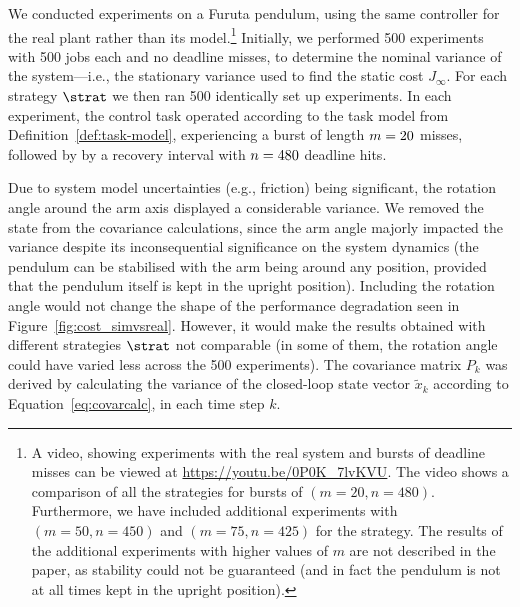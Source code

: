 We conducted experiments on a Furuta pendulum, using the same controller for the real plant rather than its model.\footnote{A video, showing experiments with the real system and bursts of deadline misses can be viewed at \url{https://youtu.be/0P0K_7lvKVU}. The video shows a comparison of all the strategies for bursts of $(m = 20, n=480)$. Furthermore, we have included additional experiments with $(m=50, n=450)$ and $(m=75, n=425)$ for the \tSH{} strategy. The results of the additional experiments with higher values of $m$ are not described in the paper, as stability could not be guaranteed (and in fact the pendulum is not at all times kept in the upright position).}
Initially, we performed 500 experiments with 500 jobs each and no deadline misses, to determine the nominal variance of the system---i.e., the stationary variance used to find the static cost $J_\infty$.
For each strategy $\strat$ we then ran 500 identically set up experiments. 
In each experiment, the control task operated according to the task model from Definition~\ref{def:task-model}, experiencing a burst of length $m=20$ misses, followed by by a recovery interval with $n=480$ deadline hits.

Due to system model uncertainties (e.g., friction) being significant, the rotation angle around the arm axis displayed a considerable variance.
We removed the state from the covariance calculations, since the arm angle majorly impacted the variance despite its inconsequential significance on the system dynamics (the pendulum can be stabilised with the arm being around any position, provided that the pendulum itself is kept in the upright position).
Including the rotation angle would not change the shape of the performance degradation seen in Figure~\ref{fig:cost_simvsreal}. 
However, it would make the results obtained with different strategies $\strat$ not comparable (in some of them, the rotation angle could have varied less across the 500 experiments). 
The covariance matrix $P_k$ was derived by calculating the variance of the closed-loop state vector $\tilde{x}_k$ according to Equation~\eqref{eq:covarcalc}, in each time step $k$. 

